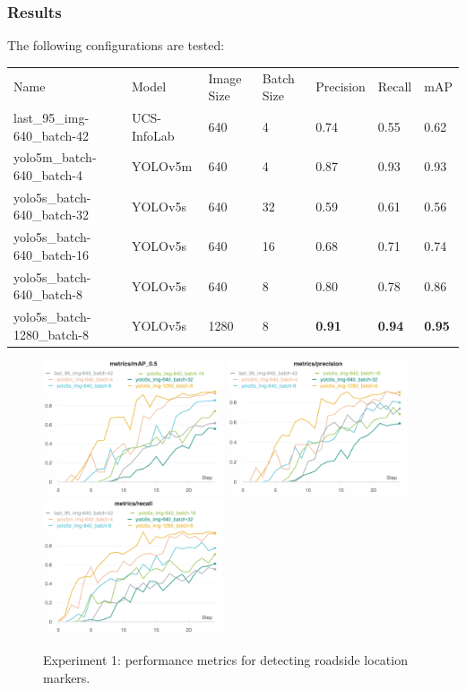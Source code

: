 \subsubsection{Results}
The following configurations are tested:


\begin{table}[h]
\begin{tabular}{lllllll}
Name                        & Model       & Image Size & Batch Size & Precision & Recall & mAP  \\
last\_95\_img-640\_batch-42 & UCS-InfoLab & 640        & 4          & 0.74      & 0.55   & 0.62 \\
yolo5m\_batch-640\_batch-4  & YOLOv5m     & 640        & 4          & 0.87      & 0.93   & 0.93 \\
yolo5s\_batch-640\_batch-32 & YOLOv5s     & 640        & 32         & 0.59      & 0.61   & 0.56 \\
yolo5s\_batch-640\_batch-16 & YOLOv5s     & 640        & 16         & 0.68      & 0.71   & 0.74 \\
yolo5s\_batch-640\_batch-8  & YOLOv5s     & 640        & 8          & 0.80      & 0.78   & 0.86 \\
yolo5s\_batch-1280\_batch-8 & YOLOv5s     & 1280       & 8           & \textbf{0.91} & \textbf{0.94} & \textbf{0.95}
\end{tabular}
\end{table}


\begin{figure}[h]
\begin{center}
\includegraphics[height=4cm,keepaspectratio]{images/5_multimodal_fusion/exp-1_mAP.png}
\includegraphics[height=4cm,keepaspectratio]{images/5_multimodal_fusion/exp-1_precision.png}
\includegraphics[height=4cm,keepaspectratio]{images/5_multimodal_fusion/exp-1_recall.png}
\end{center}
\caption{Experiment 1: performance metrics for detecting roadside location markers.}
\end{figure}



